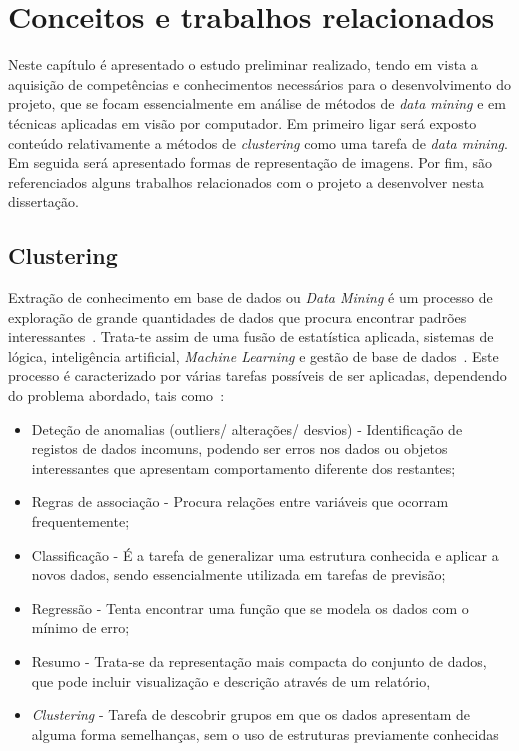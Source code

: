
\chapter{Conceitos e trabalhos relacionados} \label{chap:estarte}

Neste capítulo é apresentado o estudo preliminar realizado, tendo em vista a aquisição de competências e conhecimentos necessários para o desenvolvimento do projeto, que se focam essencialmente em análise de métodos de \textit{data mining} e em técnicas aplicadas em visão por computador. Em primeiro ligar será exposto conteúdo relativamente a métodos de \textit{clustering} como uma tarefa de \textit{data mining}. Em seguida será apresentado formas de representação de imagens. Por fim, são referenciados alguns trabalhos relacionados com o projeto a desenvolver nesta dissertação.

\section{Clustering} \label{sec:cluster}

Extração de conhecimento em base de dados ou \textit{Data Mining} é um processo de exploração de grande quantidades de dados que procura encontrar padrões interessantes~\citet{Han2006}. Trata-te assim de uma fusão de estatística aplicada, sistemas de lógica, inteligência artificial, \textit{Machine Learning} e gestão de base de dados~\citet{North2012}. Este processo é caracterizado por várias tarefas possíveis de ser aplicadas, dependendo do problema abordado, tais como~\citep{Fayyad1996}:

\begin{itemize}
\item Deteção de anomalias (outliers/ alterações/ desvios) - Identificação de registos de dados incomuns, podendo ser erros nos dados ou objetos interessantes que apresentam comportamento diferente dos restantes;
\item Regras de associação - Procura relações entre variáveis que ocorram frequentemente;
\item Classificação - É a tarefa de generalizar uma estrutura conhecida e aplicar a novos dados, sendo essencialmente utilizada em tarefas de previsão;
\item Regressão - Tenta encontrar uma função que se modela os dados com o mínimo de erro;
\item Resumo - Trata-se da representação mais compacta do conjunto de dados, que pode incluir visualização e descrição através de um relatório,
\item \textit{Clustering} - Tarefa de descobrir grupos em que os dados apresentam de alguma forma semelhanças, sem o uso de estruturas previamente conhecidas
\end{itemize}

